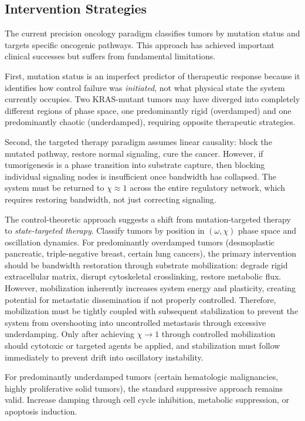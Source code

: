 \documentclass[11pt,letterpaper]{article}
\begin{document}
\subsection{Intervention Strategies}

The current precision oncology paradigm classifies tumors by mutation status and targets specific oncogenic pathways. This approach has achieved important clinical successes but suffers from fundamental limitations.

First, mutation status is an imperfect predictor of therapeutic response because it identifies how control failure was \textit{initiated}, not what physical state the system currently occupies. Two KRAS-mutant tumors may have diverged into completely different regions of phase space, one predominantly rigid (overdamped) and one predominantly chaotic (underdamped), requiring opposite therapeutic strategies.

Second, the targeted therapy paradigm assumes linear causality: block the mutated pathway, restore normal signaling, cure the cancer. However, if tumorigenesis is a phase transition into substrate capture, then blocking individual signaling nodes is insufficient once bandwidth has collapsed. The system must be returned to $\chi \approx 1$ across the entire regulatory network, which requires restoring bandwidth, not just correcting signaling.

The control-theoretic approach suggests a shift from mutation-targeted therapy to \textit{state-targeted therapy}. Classify tumors by position in $(\omega, \chi)$ phase space and oscillation dynamics. For predominantly overdamped tumors (desmoplastic pancreatic, triple-negative breast, certain lung cancers), the primary intervention should be bandwidth restoration through substrate mobilization: degrade rigid extracellular matrix, disrupt cytoskeletal crosslinking, restore metabolic flux. However, mobilization inherently increases system energy and plasticity, creating potential for metastatic dissemination if not properly controlled. Therefore, mobilization must be tightly coupled with subsequent stabilization to prevent the system from overshooting into uncontrolled metastasis through excessive underdamping. Only after achieving $\chi \to 1$ through controlled mobilization should cytotoxic or targeted agents be applied, and stabilization must follow immediately to prevent drift into oscillatory instability.

For predominantly underdamped tumors (certain hematologic malignancies, highly proliferative solid tumors), the standard suppressive approach remains valid. Increase damping through cell cycle inhibition, metabolic suppression, or apoptosis induction.
\end{document}
